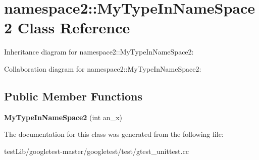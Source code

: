 \hypertarget{classnamespace2_1_1MyTypeInNameSpace2}{}\section{namespace2\+:\+:My\+Type\+In\+Name\+Space2 Class Reference}
\label{classnamespace2_1_1MyTypeInNameSpace2}


Inheritance diagram for namespace2\+:\+:My\+Type\+In\+Name\+Space2\+:


Collaboration diagram for namespace2\+:\+:My\+Type\+In\+Name\+Space2\+:
\subsection*{Public Member Functions}
\begin{DoxyCompactItemize}
\item 
\mbox{\label{classnamespace2_1_1MyTypeInNameSpace2_a033025628289dbf29022b2bfbe66f53e}} 
{\bfseries My\+Type\+In\+Name\+Space2} (int an\+\_\+x)
\end{DoxyCompactItemize}


The documentation for this class was generated from the following file\+:\begin{DoxyCompactItemize}
\item 
test\+Lib/googletest-\/master/googletest/test/gtest\+\_\+unittest.\+cc\end{DoxyCompactItemize}
